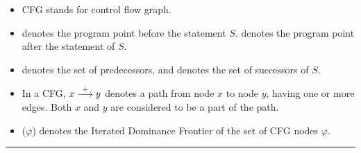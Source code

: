 \documentclass[12pt]{article}
\begin{document}
\begin{itemize}
\item CFG stands for control flow graph.
\item {} denotes the program point before the statement
  $S$.  denotes the program point after
  the statement of $S$.
\item {} denotes the set of predecessors, and 
  denotes the set of successors of $S$. %
\item In a CFG, $x \stackrel{+}{\longrightarrow} y$ denotes a path from
  node $x$ to node $y$, having one or more edges. Both $x$ and
  $y$ are considered to be a part of the path.
\item \idfp($\varphi$) denotes the Iterated Dominance Frontier of
  the set of CFG nodes $\varphi$.
\end{itemize}
\hrule
\vfill
\end{document}
